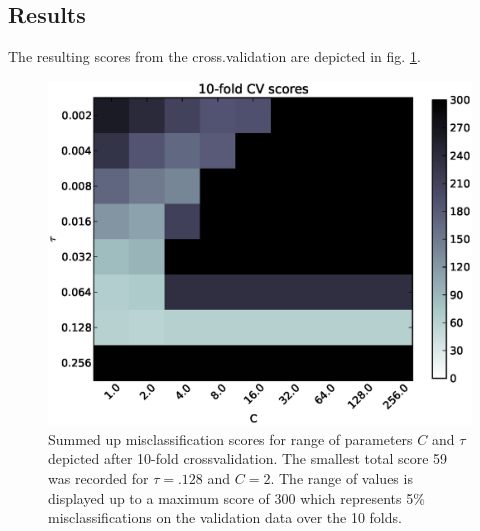 \subsection{Results}
The resulting scores from the cross.validation are depicted in fig. \ref{fig:scores}. 
\begin{figure}[!ht]
	\centering
	\includegraphics[width=.7\textwidth]{svm/scores_max_300.eps}
	\caption{Summed up misclassification scores for range of parameters $C$ and $\tau$ depicted after 10-fold crossvalidation. The smallest total score 59 was recorded for $\tau=.128$ and $C=2$. The range of values is displayed up to a maximum score of 300 which represents 5\% misclassifications on the validation data over the 10 folds.}
	\label{fig:scores}
\end{figure}

